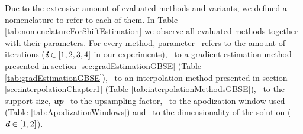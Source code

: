 Due to the extensive amount of evaluated methods and variants, we defined a nomenclature to refer to each of them. In Table \ref{tab:nomenclatureForShiftEstimation} we observe all evaluated methods together with their parameters. For every method, parameter \itParam \ refers to the amount of iterations ($\emph{\textbf{i}} \in [1,2,3,4]$ in our experiments), \grParam \ to a gradient estimation method presented in section \ref{sec:gradEstimationGBSE} (Table \ref{tab:gradEstimationGBSE}), \intParam  \ to an interpolation method presented in section \ref{sec:interpolationChapter1}  (Table \ref{tab:interpolationMethodsGBSE}), \spParam \ to the support size, \emph{\textbf{up}} \  to the upsampling factor, \winParam \ to the apodization window used (Table \ref{tab:ApodizationWindows}) and \dParam \ to the dimensionality of the solution ($\emph{\textbf{d}} \in [1,2]$). 


